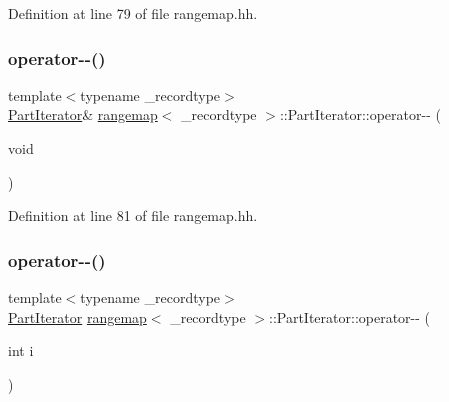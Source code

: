 Definition at line 79 of file rangemap.\+hh.

\mbox{\label{classrangemap_1_1_part_iterator_ab3a419addb975d6f0c88ed3c580d9e24}} 
\subsubsection{\texorpdfstring{operator-\/-\/()}{operator--()}\hspace{0.1cm}{\footnotesize\ttfamily [1/2]}}
{\footnotesize\ttfamily template$<$typename \+\_\+recordtype$>$ \\
\mbox{\hyperlink{classrangemap_1_1_part_iterator}{Part\+Iterator}}\& \mbox{\hyperlink{classrangemap}{rangemap}}$<$ \+\_\+recordtype $>$\+::Part\+Iterator\+::operator-\/-\/ (\begin{DoxyParamCaption}\item[{void}]{ }\end{DoxyParamCaption})\hspace{0.3cm}{\ttfamily [inline]}}



Definition at line 81 of file rangemap.\+hh.

\mbox{\label{classrangemap_1_1_part_iterator_a5f7ba5fc91566b229613b6e0fd93a3a7}} 
\subsubsection{\texorpdfstring{operator-\/-\/()}{operator--()}\hspace{0.1cm}{\footnotesize\ttfamily [2/2]}}
{\footnotesize\ttfamily template$<$typename \+\_\+recordtype$>$ \\
\mbox{\hyperlink{classrangemap_1_1_part_iterator}{Part\+Iterator}} \mbox{\hyperlink{classrangemap}{rangemap}}$<$ \+\_\+recordtype $>$\+::Part\+Iterator\+::operator-\/-\/ (\begin{DoxyParamCaption}\item[{int}]{i }\end{DoxyParamCaption})\hspace{0.3cm}{\ttfamily [inline]}}




